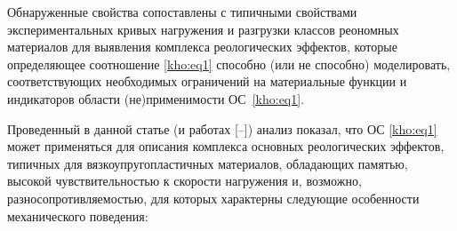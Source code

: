 Обнаруженные свойства сопоставлены с типичными свойствами экспериментальных кривых нагружения и разгрузки классов реономных материалов для выявления комплекса реологических эффектов, которые определяющее соотношение \eqref{kho:eq1} способно (или не способно) моделировать, соответствующих необходимых ограничений на материальные функции и индикаторов области (не)применимости ОС~\eqref{kho:eq1}.



Проведенный в данной статье (и работах [--]) анализ показал, что ОС \eqref{kho:eq1} может применяться для описания комплекса основных реологических эффектов, типичных для вязкоупругопластичных материалов, обладающих памятью, высокой чувствительностью к скорости нагружения и, возможно, разносопротивляемостью, для которых характерны следующие особенности механического поведения:

